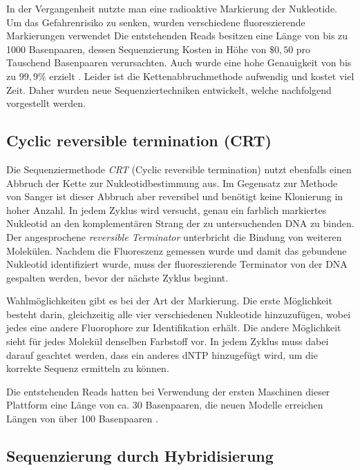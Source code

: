 In der Vergangenheit nutzte man eine radioaktive Markierung der Nukleotide. Um das Gefahrenrisiko zu senken, wurden verschiedene fluoreszierende Markierungen verwendet %
Die entstehenden Reads besitzen eine Länge von bis zu 1000 Basenpaaren, dessen Sequenzierung Kosten in Höhe von $\$0{,}50$ pro Tauschend Basenpaaren verursachten. Auch wurde eine hohe Genauigkeit von bis zu $99{,}9 \%$ erzielt \citep{Shendure2008}. Leider ist die Kettenabbruchmethode aufwendig und kostet viel Zeit. Daher wurden neue Sequenziertechniken entwickelt, welche nachfolgend vorgestellt werden.
\newline
\subsection{Cyclic reversible termination (CRT)}
\label{sec:bio:seq:crt}

Die Sequenziermethode \emph{CRT} (Cyclic reversible termination) nutzt ebenfalls einen Abbruch der Kette zur Nukleotidbestimmung aus. Im Gegensatz zur Methode von Sanger ist dieser Abbruch aber reversibel und benötigt keine Klonierung in hoher Anzahl. In jedem Zyklus wird versucht, genau ein farblich markiertes Nukleotid an den komplementären Strang der zu untersuchenden DNA zu binden. Der angesprochene \textit{reversible Terminator} unterbricht die Bindung von weiteren Molekülen. Nachdem die Fluoreszenz gemessen wurde und damit das gebundene Nukleotid identifiziert wurde, muss der fluoreszierende Terminator von der DNA gespalten werden, bevor der nächste Zyklus beginnt.

Wahlmöglichkeiten gibt es bei der Art der Markierung. Die erste Möglichkeit besteht darin, gleichzeitig alle vier verschiedenen Nukleotide hinzuzufügen, wobei jedes eine andere Fluorophore zur Identifikation erhält. Die andere Möglichkeit sieht für jedes Molekül denselben Farbstoff vor. In jedem Zyklus muss dabei darauf geachtet werden, dass ein anderes dNTP hinzugefügt wird, um die korrekte Sequenz ermitteln zu können. 

Die entstehenden Reads hatten bei Verwendung der ersten Maschinen dieser Plattform eine Länge von ca. 30 Basenpaaren, die neuen Modelle erreichen Längen von über 100 Basenpaaren \citep{Metzker2010}.
\subsection{Sequenzierung durch Hybridisierung}

